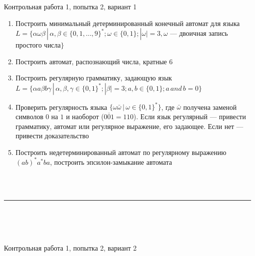\documentclass[12pt]{article}
\begin{document}

{\Large Контрольная работа 1, попытка 2, вариант 1}
\bigskip

\begin{enumerate}
  \item Построить минимальный детерминированный конечный автомат для языка \\ $L = \{ \alpha \omega \beta \, | \, \alpha, \beta \in \{ 0, 1, \dots, 9 \}^*; \omega \in \{ 0, 1 \}; |\omega| = 3, \omega$ --- двоичная запись простого числа$\}$
  \item { 
         Построить автомат, распознающий числа, кратные 6}
    \item Построить регулярную грамматику, задающую язык \\ $L = \{ \alpha a \beta b \gamma \, | \, \alpha, \beta, \gamma \in \{ 0, 1 \}^*; |\beta| = 3; a, b \in \{ 0, 1 \}; a \, and \, b = 0 \} $
    \item Проверить регулярность языка $\{ \omega \bar \omega \, | \, \omega \in \{0, 1\}^* \}$, где $\bar \omega$ получена заменой символов $0$ на $1$ и наоборот ($\overline{001} = 110$). Если язык регулярный --- привести грамматику, автомат или регулярное выражение, его задающее. Если нет --- привести доказательство
    \item {Построить недетерминированный автомат по регулярному выражению $ (ab)^*a^*ba  $, построить эпсилон-замыкание автомата}
    
\end{enumerate}

\bigskip

~\\~

\bigskip

\rule{\textwidth}{1pt}

\bigskip

~\\~\\~

\bigskip


{\Large Контрольная работа 1, попытка 2, вариант 2}
\bigskip
\end{document}
